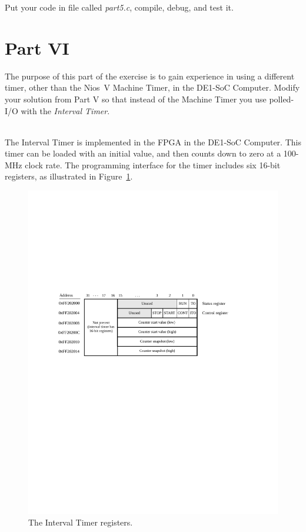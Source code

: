 \documentclass[epsfig,10pt,fullpage]{article}
\begin{document}
Put your code in file called {\it part5.c}, compile, debug, and test it.

\section*{Part VI}
The purpose of this part of the exercise is to gain experience in using a different timer,
other than the Nios~V Machine Timer, in the DE1-SoC Computer. Modify your solution from
Part V so that instead of the Machine Timer you use polled-I/O with the {\it Interval Timer}. 

~\\
The Interval Timer is implemented in the FPGA in the DE1-SoC Computer. This timer can be 
loaded with an initial value, and then counts down to zero at a 100-MHz clock rate. 
The programming interface for the timer includes six 16-bit registers, as illustrated in 
Figure~\ref{fig:intervaltimer}.

\begin{figure}[H]
	\begin{center}
	\includegraphics[scale=1]{figures/figuretimer.pdf}
	\end{center}
	\caption{The Interval Timer registers.}
\label{fig:intervaltimer}
\end{figure}
\end{document}
